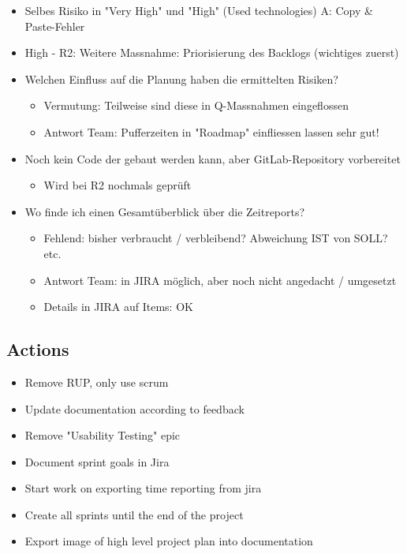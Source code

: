 \begin{itemize}
\begin{itemize}
    \end{itemize}
    \item Selbes Risiko in "Very High" und "High" (Used technologies) \textrightarrow A: Copy \& Paste-Fehler
    \item High - R2: Weitere Massnahme: Priorisierung des Backlogs (wichtiges zuerst)
    \item Welchen Einfluss auf die Planung haben die ermittelten Risiken?
    \begin{itemize}
        \item Vermutung: Teilweise sind diese in Q-Massnahmen eingeflossen
        \item Antwort Team: Pufferzeiten in "Roadmap" einfliessen lassen \textrightarrow sehr gut!
    \end{itemize}
    \item Noch kein Code der gebaut werden kann, aber GitLab-Repository vorbereitet
    \begin{itemize}
        \item Wird bei R2 nochmals geprüft
    \end{itemize}
    \item Wo finde ich einen Gesamtüberblick über die Zeitreports?
    \begin{itemize}
        \item Fehlend: bisher verbraucht / verbleibend? Abweichung IST von SOLL? etc.
        \item Antwort Team: in JIRA möglich, aber noch nicht angedacht / umgesetzt
        \item Details in JIRA auf Items: OK
    \end{itemize}
\end{itemize}

\subsection{Actions}

\begin{itemize}
    \item Remove RUP, only use scrum
    \item Update documentation according to feedback
    \item Remove "Usability Testing" epic
    \item Document sprint goals in Jira
    \item Start work on exporting time reporting from jira
    \item Create all sprints until the end of the project
    \item Export image of high level project plan into documentation
\end{itemize}
